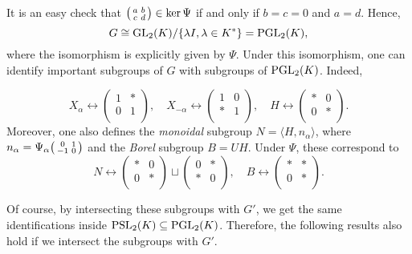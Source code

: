 It is an easy check that $\begin{psmallmatrix}
    a & b\\
    c & d\\
\end{psmallmatrix}\in\ker\Psi$ if and only if $b=c=0$ and $a=d$. Hence, $$G\cong\mathrm{GL}_2(K)/\{\lambda I,\lambda\in K^*\}=\mathrm{PGL}_2(K),$$
where the isomorphism is explicitly given by $\Psi$. Under this isomorphism, one can identify important subgroups of $G$ with subgroups of $\mathrm{PGL}_2(K)$. Indeed,

$$X_\alpha \longleftrightarrow\begin{pmatrix}
    1 & *\\
    0 & 1\\
\end{pmatrix},\quad X_{-\alpha} \longleftrightarrow\begin{pmatrix}
    1 & 0\\
    * & 1\\
\end{pmatrix},\quad H\longleftrightarrow\begin{pmatrix}
    * & 0\\
    0 & *\\
\end{pmatrix}.$$
Moreover, one also defines the \textit{monoidal} subgroup $N=\langle H,n_\alpha\rangle$, where $n_\alpha=\Psi_\alpha\begin{psmallmatrix}
    0 & 1\\
    -1 & 0\\
\end{psmallmatrix}$ and the \textit{Borel} subgroup $B=UH$. Under $\Psi$, these correspond to
$$N\longleftrightarrow\begin{pmatrix}
    * & 0\\
    0 & *\\
\end{pmatrix}\sqcup\begin{pmatrix}
    0 & *\\
    * & 0\\
\end{pmatrix},\quad B\longleftrightarrow\begin{pmatrix}
    * & *\\
    0 & *\\
\end{pmatrix}.$$

Of course, by intersecting these subgroups with $G'$, we get the same identifications inside $\mathrm{PSL}_2(K)\subseteq\mathrm{PGL}_2(K)$. Therefore, the following results also hold if we intersect the subgroups with $G'$.

